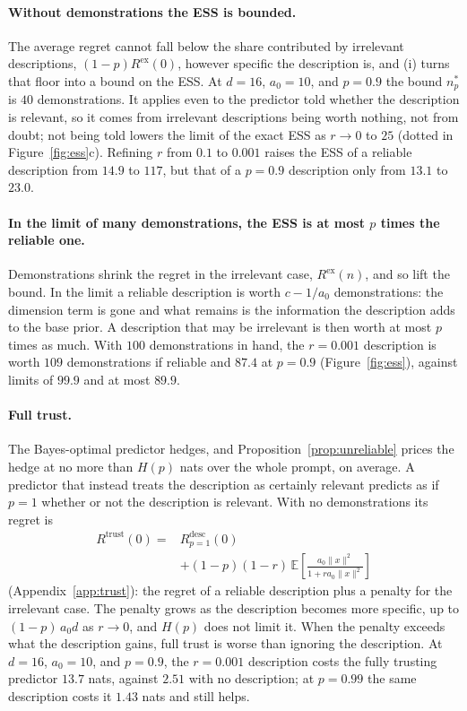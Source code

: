 \documentclass{article}
\newcommand{\E}{\mathbb{E}}
\begin{document}
\paragraph{Without demonstrations the ESS is bounded.} The average regret cannot fall below the share contributed by irrelevant descriptions, $(1-p)R^{\mathrm{ex}}(0)$, however specific the description is, and (i) turns that floor into a bound on the ESS. At $d = 16$, $a_0 = 10$, and $p = 0.9$ the bound $n^*_p$ is $40$ demonstrations. It applies even to the predictor told whether the description is relevant, so it comes from irrelevant descriptions being worth nothing, not from doubt; not being told lowers the limit of the exact ESS as $r \to 0$ to $25$ (dotted in Figure~\ref{fig:ess}c). Refining $r$ from $0.1$ to $0.001$ raises the ESS of a reliable description from $14.9$ to $117$, but that of a $p = 0.9$ description only from $13.1$ to $23.0$.

\paragraph{In the limit of many demonstrations, the ESS is at most $p$ times the reliable one.} Demonstrations shrink the regret in the irrelevant case, $R^{\mathrm{ex}}(n)$, and so lift the bound. In the limit a reliable description is worth $c - 1/a_0$ demonstrations: the dimension term is gone and what remains is the information the description adds to the base prior. A description that may be irrelevant is then worth at most $p$ times as much. With $100$ demonstrations in hand, the $r = 0.001$ description is worth $109$ demonstrations if reliable and $87.4$ at $p = 0.9$ (Figure~\ref{fig:ess}), against limits of $99.9$ and at most $89.9$.

\paragraph{Full trust.} The Bayes-optimal predictor hedges, and Proposition~\ref{prop:unreliable} prices the hedge at no more than $H(p)$ nats over the whole prompt, on average. A predictor that instead treats the description as certainly relevant predicts as if $p = 1$ whether or not the description is relevant. With no demonstrations its regret is
\begin{equation}\label{eq:trust}
    \begin{split}
    R^{\mathrm{trust}}(0) = {}& R^{\mathrm{desc}}_{p=1}(0) \\
    &+ (1-p)(1-r)\,\E\!\left[\frac{a_0\|x\|^2}{1 + r a_0 \|x\|^2}\right]
    \end{split}
\end{equation}
(Appendix~\ref{app:trust}): the regret of a reliable description plus a penalty for the irrelevant case. The penalty grows as the description becomes more specific, up to $(1-p)\,a_0 d$ as $r \to 0$, and $H(p)$ does not limit it. When the penalty exceeds what the description gains, full trust is worse than ignoring the description. At $d = 16$, $a_0 = 10$, and $p = 0.9$, the $r = 0.001$ description costs the fully trusting predictor $13.7$ nats, against $2.51$ with no description; at $p = 0.99$ the same description costs it $1.43$ nats and still helps.
\end{document}
